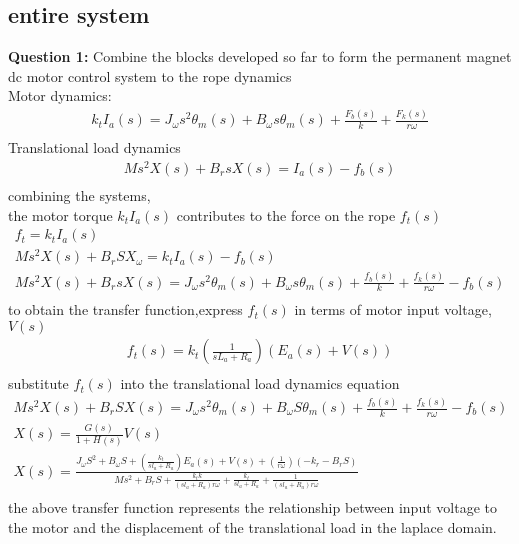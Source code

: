 \documentclass[10pt,a4paper]{report}
\begin{document}
\subsection{entire system}
\textbf{Question 1:}
Combine the blocks developed so far to form the permanent magnet dc motor control system
to the rope dynamics\\
Motor dynamics: 
\begin{eqnarray}
  k_{t}I_{a}(s) = J_{\omega}s^2 \theta_{m}(s) + B_{\omega}s \theta_{m}(s) + \frac{F_{b}(s)}{k} + \frac{F_{k}(s)}
  {r \omega}\nonumber\\
\end{eqnarray}
Translational load dynamics
\begin{eqnarray}
  Ms^2X(s) + B_{r}sX(s) = I_{a}(s) - f_{b}(s)\\
\end{eqnarray}
combining the systems,\\
the motor torque $k_{t}I_{a}(s)$ contributes to the force on the rope $f_{t}(s)$\\
\begin{eqnarray}
  f_{t} = k_{t}I_{a}(s)\\
  Ms^2X(s) + B_{r}SX_{\omega} = k_{t}I_{a}(s) - f_{b}(s)\\
  Ms^2X(s) + B_{r}sX(s) = J_{\omega}s^2 \theta_{m}(s) + B_{\omega}s \theta_{m}(s) + \frac{f_{b}(s)}{k} +\nonumber 
  \frac{f_{k}(s)}{r\omega} - f_{b}(s)\\
\end{eqnarray}
to obtain the transfer function,express $f_{t}(s)$ in terms of motor input voltage, $V(s)$\\
\begin{eqnarray}
  f_{t}(s) = k_{t} (\frac{1}{sL_{a} + R_{a}})(E_{a}(s) + V(s))\\
\end{eqnarray}
substitute $f_{t}(s)$ into the translational load dynamics equation\\
\begin{eqnarray}
  Ms^2X(s) + B_{r}SX(s) = J_{\omega}s^2 \theta_{m}(s) + B_{\omega}S \theta_{m}(s) + \frac{f_{b}(s)}{k} +\nonumber 
  \frac{f_{k}(s)}{r\omega} - f_{b}(s)\\
  X(s) = \frac{G(s)}{1 + H(s)}V(s)\\
  X(s) = \frac{J_{\omega}S^2 + B_{\omega}S + (\frac{k_{t}}{sl_{a} + R_{a}}) E_{a}(s) + V(s) +\nonumber 
  (\frac{1}{r\omega}) (-k_{r} - B_{r}S)}{Ms^2 + B_{r}S + \frac{k_{t}k}{(sl_{a} + R_{a}) r\omega} +\nonumber 
  \frac{k_{t}}{sl_{a} +R_{a}} + \frac{1}{(sl_{a} + R_{a}) r\omega}}\\
\end{eqnarray}
the above transfer function represents the relationship between input voltage to the motor and the displacement of the translational load in the laplace domain.
\pagebreak
\end{document}
